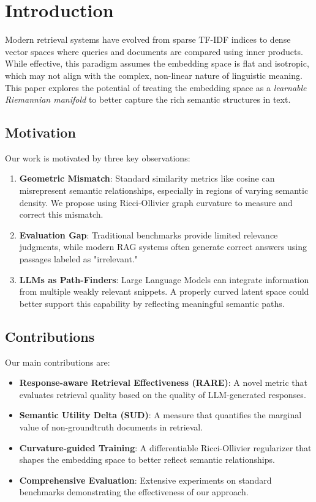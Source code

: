 \section{Introduction}
Modern retrieval systems have evolved from sparse TF-IDF indices to dense vector spaces where queries and documents are compared using inner products. While effective, this paradigm assumes the embedding space is flat and isotropic, which may not align with the complex, non-linear nature of linguistic meaning. This paper explores the potential of treating the embedding space as a \emph{learnable Riemannian manifold} to better capture the rich semantic structures in text.

\subsection{Motivation}
Our work is motivated by three key observations:

\begin{enumerate}
    \item \textbf{Geometric Mismatch}: Standard similarity metrics like cosine can misrepresent semantic relationships, especially in regions of varying semantic density. We propose using Ricci-Ollivier graph curvature to measure and correct this mismatch.
    
    \item \textbf{Evaluation Gap}: Traditional benchmarks provide limited relevance judgments, while modern RAG systems often generate correct answers using passages labeled as "irrelevant."
    
    \item \textbf{LLMs as Path-Finders}: Large Language Models can integrate information from multiple weakly relevant snippets. A properly curved latent space could better support this capability by reflecting meaningful semantic paths.
\end{enumerate}

\subsection{Contributions}
Our main contributions are:

\begin{itemize}
    \item \textbf{Response-aware Retrieval Effectiveness (RARE)}: A novel metric that evaluates retrieval quality based on the quality of LLM-generated responses.
    
    \item \textbf{Semantic Utility Delta (SUD)}: A measure that quantifies the marginal value of non-groundtruth documents in retrieval.
    
    \item \textbf{Curvature-guided Training}: A differentiable Ricci-Ollivier regularizer that shapes the embedding space to better reflect semantic relationships.
    
    \item \textbf{Comprehensive Evaluation}: Extensive experiments on standard benchmarks demonstrating the effectiveness of our approach.
\end{itemize}

